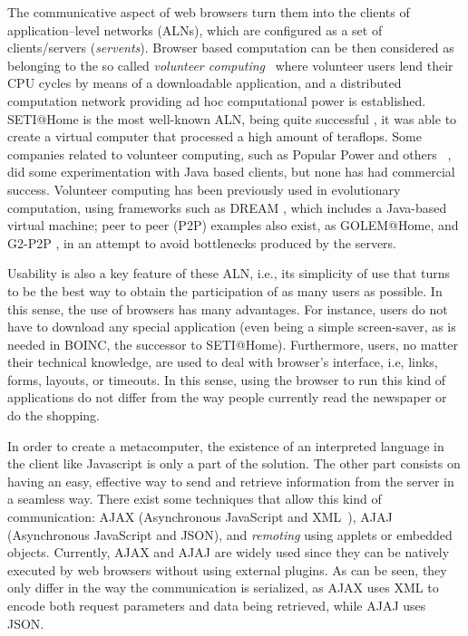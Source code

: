 \documentclass[runningheads,a4paper]{llncs}
\begin{document}
The communicative aspect of web browsers turn them into the clients of application--level networks (ALNs), which are configured as a set of
clients/servers ({\em servents}). Browser based computation can be then considered as belonging to the so called  {\em volunteer computing}~\cite{sarmenta-bayanihan,hpvc} where volunteer users lend their CPU cycles by means of a downloadable application, and a distributed computation network providing ad hoc computational power is established. SETI@Home is the most well-known ALN, being quite successful \cite{david-seti:home}, it was able to	
create a virtual computer that processed a high amount of
teraflops.  Some companies related to volunteer computing, such as Popular Power and
others ~\cite{Cappello}, did some experimentation with Java based
clients, but none has had commercial success. Volunteer computing has
been previously used in evolutionary computation, using
frameworks such as DREAM \cite{LNCS2439:ID197:pp665}, which includes a
Java-based virtual machine; peer to peer (P2P) examples also exist, as  GOLEM@Home, and G2-P2P \cite{G2-P2P}, in an attempt to avoid bottlenecks produced by the servers.


Usability is also a key feature of these ALN, i.e., its simplicity
of use that turns to be the best way to obtain the participation of as
many users as possible. In this sense, the use of browsers has many advantages. For instance, users do not have to download any special application (even being a simple screen-saver, as is needed in BOINC, the successor to SETI@Home). Furthermore, users, no matter their technical knowledge, are used to deal with browser's interface, i.e, links, forms, layouts, or timeouts. In this sense, using the browser to run this kind of applications do not differ from the way people currently read the newspaper or do the shopping.

In order to create a metacomputer, the existence of an interpreted language in the client like Javascript is only a part of the solution. The other part consists on having an easy, effective way to send and retrieve information from the server in a seamless way. There exist some techniques that allow this kind of communication: AJAX (Asynchronous JavaScript and
XML~\cite{brinzarea2010ajax}), AJAJ (Asynchronous JavaScript and JSON), and {\em remoting} using
applets or embedded objects. Currently, AJAX and AJAJ are widely used since they can be natively executed by web browsers without using external plugins. As can be seen, they only differ in the way the communication is serialized, as AJAX uses XML\cite{goldberg2009xml} to encode both request parameters and data being retrieved, while AJAJ uses JSON. 
\end{document}
